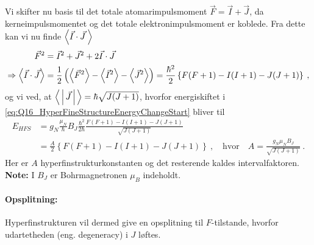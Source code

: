Vi skifter nu basis til det totale atomarimpulsmoment $\vec{F} = \vec{I} + \vec{J}$, da kerneimpulsmomentet og det totale elektronimpulsmoment er koblede. Fra dette kan vi nu finde $\Braket{\vec{I} \cdot \vec{J} \:}$
\begin{align}
    \Vec{F}^2 &= \Vec{I}^2 + \Vec{J}^2 + 2\Vec{I} \cdot \Vec{J} \nonumber\\
    \Rightarrow \Braket{\Vec{I} \cdot \Vec{J}} &= \frac{1}{2} \left(\Braket{\Vec{F}^2} - \Braket{\Vec{I}^2} - \Braket{\Vec{J}^2}\right) = \frac{\hbar^2}{2} \left\{F(F+1) - I(I+1) - J(J+1)\right\} \: ,
\end{align}
og vi ved, at $\Braket{|\vec{J}|} = \hbar \sqrt{J(J+1)}$, hvorfor energiskiftet i \cref{eq:Q16_HyperFineStructureEnergyChangeStart} bliver til
\begin{align} \label{eq:Q16_HyperFineStructureEnergyChange}
    E_{HFS} &= g_N \frac{\mu_N}{\hbar} B_J \frac{\hbar^2}{2\hbar} \frac{F(F+1) - I(I+1) - J(J+1)}{\sqrt{J(J+1)}} \nonumber\\
    &= \frac{A}{2}\left\{F(F+1) - I(I+1) - J(J+1)\right\} \: , \quad \text{hvor} \quad A = \frac{g_N \mu_N B_J}{\sqrt{J(J+1)}} \: .
\end{align}
Her er $A$ \textsf{hyperfinstrukturkonstanten} og det resterende kaldes \textsf{intervalfaktoren}. \textbf{Note:} I $B_J$ er Bohrmagnetronen $\mu_B$ indeholdt.


\paragraph{Opsplitning:} Hyperfinstrukturen vil dermed give en opsplitning til $F$-tilstande, hvorfor udartetheden (eng. degeneracy) i $J$ løftes.\\


